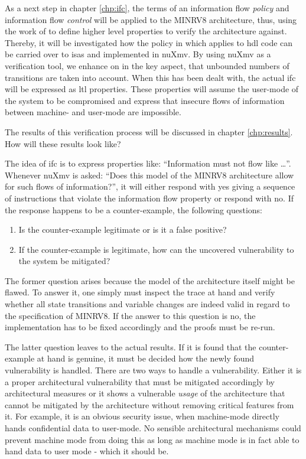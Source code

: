 As a next step in chapter \ref{chp:ifc}, the terms of an information flow \textit{policy} and information flow \textit{control} will be applied to the MINRV8 architecture, thus, using the work of \citeauthor{Ferraiuolo17} \cite{Ferraiuolo17} to define higher level properties to verify the architecture against.
Thereby, it will be investigated how the policy in \cite{Ferraiuolo17} which applies to \gls{hdl} code can be carried over to \glspl{isa} and implemented in nuXmv.
By using nuXmv as a verification tool, we enhance on \cite{Reid17} in the key aspect, that unbounded numbers of transitions are taken into account.
When this has been dealt with, the actual \gls{ifc} will be expressed as \gls{ltl} properties.
These properties will assume the user-mode of the system to be compromised and express that insecure flows of information between machine- and user-mode are impossible.

The results of this verification process will be discussed in chapter \ref{chp:results}.
How will these results look like?

The idea of \gls{ifc} is to express properties like: \enquote{Information must not flow like \dots}.
Whenever nuXmv is asked: \enquote{Does this model of the MINRV8 architecture allow for such flows of information?}, it will either respond with yes giving a sequence of instructions that violate the information flow property or respond with no.
If the response happens to be a counter-example, the following questions:
\begin{enumerate}
    \item \label{itm:counter-ex-validity}
    Is the counter-example legitimate or is it a false positive?
    \item \label{itm:counter-ex-mitigation}
    If the counter-example is legitimate, how can the uncovered vulnerability to the system be mitigated?
\end{enumerate}

The former question arises because the model of the architecture itself might be flawed.
To answer it, one simply must inspect the trace at hand and verify whether all state transitions and variable changes are indeed valid in regard to the specification of MINRV8.
If the answer to this question is no, the implementation has to be fixed accordingly and the proofs must be re-run.

The latter question leaves to the actual results.
If it is found that the counter-example at hand is genuine, it must be decided how the newly found vulnerability is handled.
There are two ways to handle a vulnerability.
Either it is a proper architectural vulnerability that must be mitigated accordingly by architectural measures or it shows a vulnerable \textit{usage} of the architecture that cannot be mitigated by the architecture without removing critical features from it.
For example, it is an obvious security issue, when machine-mode directly hands confidential data to user-mode.
No sensible architectural mechanisms could prevent machine mode from doing this as long as machine mode is in fact able to hand data to user mode - which it should be.

